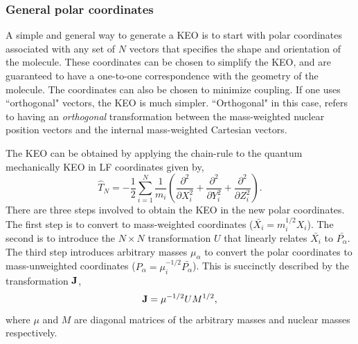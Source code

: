 \subsubsection{General polar coordinates}\label{sec.TMC}
A simple and general way to generate a KEO is to start with polar coordinates associated with any set of $N$ vectors that specifies the shape and orientation of the molecule.  These coordinates can be chosen to simplify the KEO, and are guaranteed to have a one-to-one correspondence with the geometry of the molecule.  The coordinates can also be chosen to minimize coupling.  If one uses ``orthogonal" vectors, the KEO is much simpler.  ``Orthogonal" in this case, refers to having an \emph{orthogonal} transformation between the mass-weighted nuclear position vectors and the internal mass-weighted Cartesian vectors.

The KEO can be obtained by applying the chain-rule to the quantum mechanically KEO in LF coordinates given by,
\begin{equation}\label{eq.b11}
\hat{T}_N=-\dfrac{1}{2}\sum_{i=1}^{N}\dfrac{1}{m_i}\left(\dfrac{\partial^2}{\partial X_i^2}+\dfrac{\partial^2}{\partial Y_i^2}+\dfrac{\partial^2}{\partial Z_i^2}\right).
\end{equation}
There are three steps involved to obtain the KEO in the new polar coordinates.  The first step is to convert to mass-weighted coordinates ($\bar{X_i}=m_i^{1/2} X_i$).  The second is to introduce the $N \times N$ transformation $U$ that linearly relates $\bar{X_i}$ to $\bar{P_{\alpha}}$.  The third step introduces arbitrary masses $\mu _{\alpha}$ to convert the polar coordinates to mass-unweighted coordinates ($P_{\alpha}=\mu _i^{-1/2} \bar{P_{\alpha}}$).  This is succinctly described by the transformation ${{\bf J}}$,
\begin{equation}\label{eq.b12}
{{\bf J}}=\mu ^{-1/2}UM^{1/2}, 
\end{equation}
where $\mu$ and $M$ are diagonal matrices of the arbitrary masses and nuclear masses respectively.

